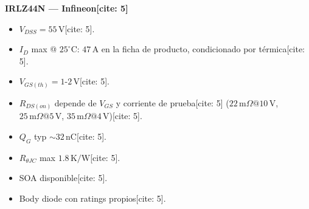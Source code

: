 \documentclass[11pt, a4paper]{article}
\begin{document}
\vfill
\begin{tcolorbox}[colback=yellow!10, colframe=gray, title=\textbf{Datasheet de Demostración (Solo Ilustrativo)[cite: 5]}]
    \textbf{IRLZ44N — Infineon[cite: 5]}
    \begin{itemize}
        \item $V_{DSS} = 55\,\text{V}$[cite: 5].
        \item $I_D$ max @ $25^\circ\text{C}$: $47\,\text{A}$ en la ficha de producto, condicionado por térmica[cite: 5].
        \item $V_{GS(th)} = 1\text{-}2\,\text{V}$[cite: 5].
        \item $R_{DS(on)}$ depende de $V_{GS}$ y corriente de prueba[cite: 5] ($22\,\text{m}\Omega @ 10\,\text{V}$, $25\,\text{m}\Omega @ 5\,\text{V}$, $35\,\text{m}\Omega @ 4\,\text{V}$)[cite: 5].
        \item $Q_G$ typ $\sim 32\,\text{nC}$[cite: 5].
        \item $R_{\theta JC}$ max $1.8\,\text{K/W}$[cite: 5].
        \item SOA disponible[cite: 5].
        \item Body diode con ratings propios[cite: 5].
    \end{itemize}
\end{tcolorbox}
\end{document}
